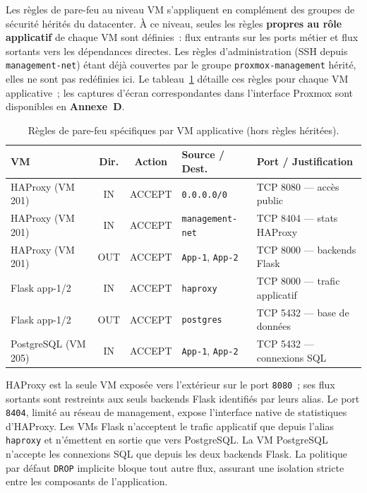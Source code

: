 
\par Les règles de pare-feu au niveau VM s'appliquent en complément des
groupes de sécurité hérités du datacenter. À ce niveau, seules les règles
\textbf{propres au rôle applicatif} de chaque VM sont définies~: flux
entrants sur les ports métier et flux sortants vers les dépendances directes.
Les règles d'administration (SSH depuis \texttt{management-net}) étant déjà
couvertes par le groupe \texttt{proxmox-management} hérité, elles ne sont
pas redéfinies ici. Le tableau~\ref{tab:fw-vm-rules} détaille ces règles
pour chaque VM applicative~; les captures d'écran correspondantes dans
l'interface Proxmox sont disponibles en \textbf{Annexe~D}.

\begin{table}[H]
\centering
\caption{Règles de pare-feu spécifiques par VM applicative (hors règles héritées).}
\label{tab:fw-vm-rules}
\small
\begin{tabular}{|l|c|c|l|l|}
\hline
\textbf{VM} & \textbf{Dir.} & \textbf{Action} & \textbf{Source / Dest.} & \textbf{Port / Justification} \\
\hline
HAProxy (VM 201) & IN  & ACCEPT & \texttt{0.0.0.0/0}             & TCP 8080 — accès public \\
\hline
HAProxy (VM 201) & IN  & ACCEPT & \texttt{management-net}        & TCP 8404 — stats HAProxy \\
\hline
HAProxy (VM 201) & OUT & ACCEPT & \texttt{App-1}, \texttt{App-2} & TCP 8000 — backends Flask \\
\hline
Flask app-1/2    & IN  & ACCEPT & \texttt{haproxy}               & TCP 8000 — trafic applicatif \\
\hline
Flask app-1/2    & OUT & ACCEPT & \texttt{postgres}              & TCP 5432 — base de données \\
\hline
PostgreSQL (VM 205) & IN & ACCEPT & \texttt{App-1}, \texttt{App-2} & TCP 5432 — connexions SQL \\
\hline
\end{tabular}
\normalsize
\end{table}

\par HAProxy est la seule VM exposée vers l'extérieur sur le port
\texttt{8080}~; ses flux sortants sont restreints aux seuls backends Flask
identifiés par leurs alias. Le port \texttt{8404}, limité au réseau de
management, expose l'interface native de statistiques d'HAProxy. Les VMs
Flask n'acceptent le trafic applicatif que depuis l'alias \texttt{haproxy}
et n'émettent en sortie que vers PostgreSQL. La VM PostgreSQL n'accepte les
connexions SQL que depuis les deux backends Flask. La politique par défaut
\texttt{DROP} implicite bloque tout autre flux, assurant une isolation
stricte entre les composants de l'application.\\

